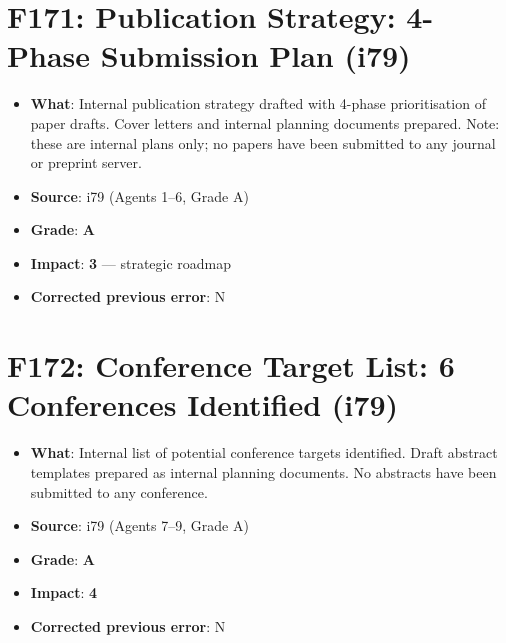 \documentclass[11pt,a4paper]{article}
\newcommand{\grade}[1]{\textbf{#1}}
\newcommand{\impact}[1]{\textbf{#1}}
\begin{document}
\section{F171: Publication Strategy: 4-Phase Submission Plan (i79)}
\begin{itemize}[nosep]
\item \textbf{What}: Internal publication strategy drafted with 4-phase prioritisation of paper drafts. Cover letters and internal planning documents prepared. Note: these are internal plans only; no papers have been submitted to any journal or preprint server.
\item \textbf{Source}: i79 (Agents 1--6, Grade A)
\item \textbf{Grade}: \grade{A}
\item \textbf{Impact}: \impact{3} --- strategic roadmap
\item \textbf{Corrected previous error}: N
\end{itemize}

\section{F172: Conference Target List: 6 Conferences Identified (i79)}
\begin{itemize}[nosep]
\item \textbf{What}: Internal list of potential conference targets identified. Draft abstract templates prepared as internal planning documents. No abstracts have been submitted to any conference.
\item \textbf{Source}: i79 (Agents 7--9, Grade A)
\item \textbf{Grade}: \grade{A}
\item \textbf{Impact}: \impact{4}
\item \textbf{Corrected previous error}: N
\end{itemize}

\end{document}
